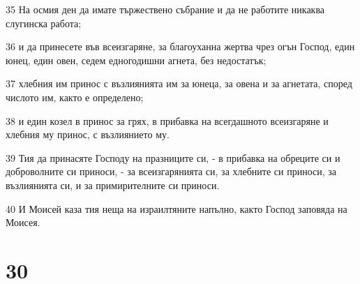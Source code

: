 \par 35 На осмия ден да имате тържествено събрание и да не работите никаква слугинска работа;
\par 36 и да принесете във всеизгаряне, за благоуханна жертва чрез огън Господ, един юнец, един овен, седем едногодишни агнета, без недостатък;
\par 37 хлебния им принос с възлиянията им за юнеца, за овена и за агнетата, според числото им, както е определено;
\par 38 и един козел в принос за грях, в прибавка на всегдашното всеизгаряне и хлебния му принос, с възлиянието му.
\par 39 Тия да принасяте Господу на празниците си, - в прибавка на обреците си и доброволните си приноси, - за всеизгарянията си, за хлебните си приноси, за възлиянията си, и за примирителните си приноси.
\par 40 И Моисей каза тия неща на израилтяните напълно, както Господ заповяда на Моисея.

\chapter{30}

